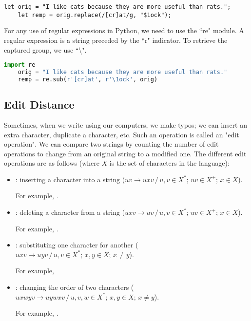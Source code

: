 \documentclass{KBook}
\begin{document}
\begin{lstlisting}[language={[KB]Javascript}, style=codeStyle]
	let orig = "I like cats because they are more useful than rats.";
	let remp = orig.replace(/[cr]at/g, "$1ock");
\end{lstlisting}

For any use of regular expressions in Python, we need to use the ``re" module.
A regular expression is a string preceded by the ``r" indicator.
To retrieve the captured group, we use ``\textbackslash".

\begin{lstlisting}[language=Python, style=codeStyle]
	import re
	orig = "I like cats because they are more useful than rats."
	remp = re.sub(r'[cr]at', r'\1ock', orig)
\end{lstlisting}


\subsection{Edit Distance}

Sometimes, when we write using our computers, we make typos; we can insert an extra character, duplicate a character, etc. 
Such an operation is called an "edit operation". 
We can compare two strings by counting the number of edit operations to change from an original string to a modified one. 
The different edit operations are as follows (where $X$ is the set of characters in the language):
%
\begin{itemize}
	\item {}: inserting a character into a string ($uv \rightarrow uxv \,/\, u, v \in X^*;\, uv \in X^+;\, x \in X$). 
	
	For example, .
	
	\item {}: deleting a character from a string ($uxv \rightarrow uv \,/\, u, v \in X^*;\, uv \in X^+;\, x \in X$). 
	
	For example, .
	
	\item {}: substituting one character for another ($uxv \rightarrow uyv \,/\, u, v \in X^*;\, x, y \in X;\, x \ne y$). 
	
	For example, 
	
	\item {}: changing the order of two characters ($uxwyv \rightarrow uywxv \,/\, u, v, w \in X^*;\, x, y \in X;\, x \ne y$). 
	
	For example, .
\end{itemize}
\end{document}
